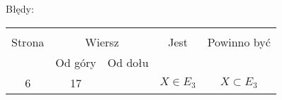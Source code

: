 \documentclass[a4paper,11pt]{article}
\begin{document}

%

Błędy:\\
\begin{tabular}{|c|c|c|c|c|}
  \hline
  & \multicolumn{2}{c|}{} & & \\
  Strona & \multicolumn{2}{c|}{Wiersz} & Jest
                            & Powinno być \\ \cline{2-3}
  & Od góry & Od dołu & & \\
  \hline
  6 & 17 & & $X \in E_{ 3 }$ & $X \subset E_{ 3 }$ \\
  \hline
\end{tabular}





 {}




\end{document}
